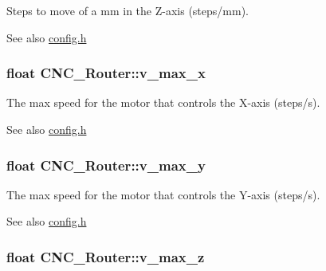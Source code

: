 Steps to move of a mm in the Z-\/axis (steps/mm). 

\begin{DoxySeeAlso}{See also}
\hyperlink{config_8h}{config.\+h} 
\end{DoxySeeAlso}
\hypertarget{class_c_n_c___router_afa08612e63f2cc3d3283fa06679b5d7a}{
\subsubsection[{v\+\_\+max\+\_\+x}]{\setlength{\rightskip}{0pt plus 5cm}float C\+N\+C\+\_\+\+Router\+::v\+\_\+max\+\_\+x\hspace{0.3cm}{\ttfamily [private]}}}\label{class_c_n_c___router_afa08612e63f2cc3d3283fa06679b5d7a}


The max speed for the motor that controls the X-\/axis (steps/s). 

\begin{DoxySeeAlso}{See also}
\hyperlink{config_8h}{config.\+h} 
\end{DoxySeeAlso}
\hypertarget{class_c_n_c___router_a5e3fe2fd85292f3f5d9d2e13078b6a42}{
\subsubsection[{v\+\_\+max\+\_\+y}]{\setlength{\rightskip}{0pt plus 5cm}float C\+N\+C\+\_\+\+Router\+::v\+\_\+max\+\_\+y\hspace{0.3cm}{\ttfamily [private]}}}\label{class_c_n_c___router_a5e3fe2fd85292f3f5d9d2e13078b6a42}


The max speed for the motor that controls the Y-\/axis (steps/s). 

\begin{DoxySeeAlso}{See also}
\hyperlink{config_8h}{config.\+h} 
\end{DoxySeeAlso}
\hypertarget{class_c_n_c___router_a9e6e9d29184c011ec64e9648995af4cb}{
\subsubsection[{v\+\_\+max\+\_\+z}]{\setlength{\rightskip}{0pt plus 5cm}float C\+N\+C\+\_\+\+Router\+::v\+\_\+max\+\_\+z\hspace{0.3cm}{\ttfamily [private]}}}\label{class_c_n_c___router_a9e6e9d29184c011ec64e9648995af4cb}


